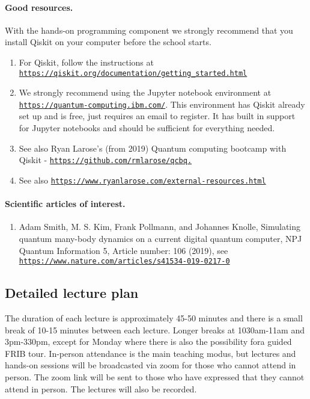 \documentclass[%
oneside,                 %
final,                   %
10pt]{article}
\begin{document}
\noindent
\paragraph{Good resources.}
With the hands-on programming component we strongly recommend that you install Qiskit on your computer before the school starts. 
\begin{enumerate}
\item For Qiskit, follow the  instructions at \href{{https://qiskit.org/documentation/getting_started.html}}{\nolinkurl{https://qiskit.org/documentation/getting_started.html}}

\item We strongly recommend using the Jupyter notebook environment at \href{{https://quantum-computing.ibm.com/}}{\nolinkurl{https://quantum-computing.ibm.com/}}. This environment has Qiskit already set up and is free,  just requires an email to register. It has built in support for Jupyter notebooks and should be sufficient for everything needed.

\item See also Ryan Larose's (from 2019) Quantum computing bootcamp with Qiskit - \href{{https://github.com/rmlarose/qcbq.}}{\nolinkurl{https://github.com/rmlarose/qcbq.}}

\item See also \href{{https://www.ryanlarose.com/external-resources.html}}{\nolinkurl{https://www.ryanlarose.com/external-resources.html}}
\end{enumerate}

\noindent
\paragraph{Scientific articles of interest.}
\begin{enumerate}
\item Adam Smith, M. S. Kim, Frank Pollmann, and Johannes Knolle, Simulating quantum many-body dynamics on a current digital quantum computer, NPJ Quantum Information 5, Article number: 106 (2019), see \href{{https://www.nature.com/articles/s41534-019-0217-0}}{\nolinkurl{https://www.nature.com/articles/s41534-019-0217-0}}
\end{enumerate}

\noindent
\subsection{Detailed lecture plan}

The duration of each lecture is approximately 45-50 minutes and there
is a small break of 10-15 minutes between each lecture. Longer breaks
at 1030am-11am and 3pm-330pm, except for Monday where there is also
the possibility fora guided FRIB tour.  In-person attendance is the
main teaching modus, but lectures and hands-on sessions will be
broadcasted via zoom for those who cannot attend in person. The zoom
link will be sent to those who have expressed that they cannot attend
in person. The lectures will also be recorded.
\end{document}
